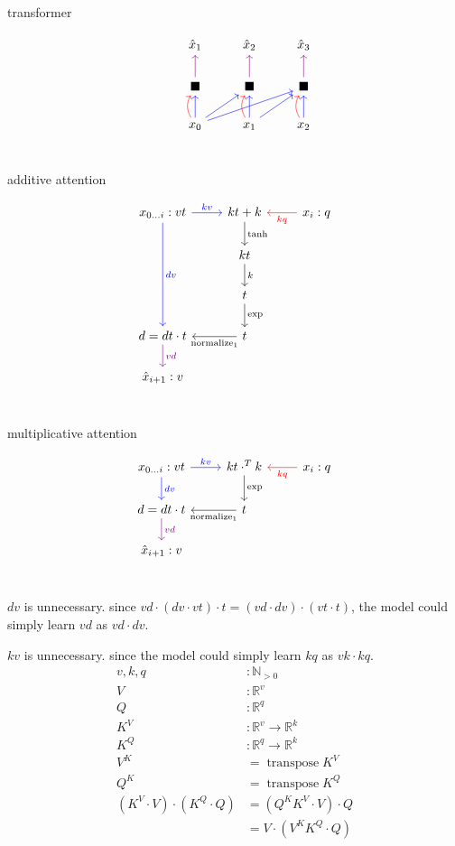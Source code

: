 \documentclass{article}
\begin{document}
transformer

\[\begin{tikzcd}
    &\hat{x}_{1} &\hat{x}_{2} &\hat{x}_{3}\\
    &\blacksquare \ar[violet]{u} &\blacksquare \ar[violet]{u} &\blacksquare \ar[violet]{u}\\
    &x_{0} \ar[red, bend left]{u} \ar[blue]{u} \ar[blue]{ur} \ar[blue]{urr} &x_{1} \ar[red, bend left]{u} \ar[blue]{u} \ar[blue]{ur} &x_{2} \ar[red, bend left]{u} \ar[blue]{u}\\
  \end{tikzcd}\]

additive attention

\[\begin{tikzcd}
    x_{0 \ldots i} : vt \ar[blue]{ddd}{dv} \ar[blue]{r}{kv} &kt + k \ar{d}{\tanh} &x_{i} : q \ar[red]{l}{kq}\\
    &kt \ar{d}{k} &\\
    &t \ar{d}{\exp} &\\
    d = dt \cdot t \ar[violet]{d}{vd} &t \ar{l}{\operatorname{normalize}_{1}} &\\
    \hat{x}_{i+1} : v &&\\
  \end{tikzcd}\]

multiplicative attention

\[\begin{tikzcd}
    x_{0 \ldots i} : vt \ar[blue]{d}{dv} \ar[blue]{r}{kv} &kt \cdot^{T} k \ar{d}{\exp} &x_{i} : q \ar[red]{l}{kq}\\
    d = dt \cdot t \ar[violet]{d}{vd} &t \ar{l}{\operatorname{normalize}_{1}} &\\
    \hat{x}_{i+1} : v &&\\
  \end{tikzcd}\]

\(dv\) is unnecessary.
since \(vd \cdot (dv \cdot vt) \cdot t = (vd \cdot dv) \cdot (vt \cdot t)\),
the model could simply learn \(vd\) as \(vd \cdot dv\).

\(kv\) is unnecessary.
since the model could simply learn \(kq\) as \(vk \cdot kq\).
\begin{align*}
  v, k, q &: \mathbb{N}_{>0}\\
  V &: \mathbb{R}^{v}\\
  Q &: \mathbb{R}^{q}\\
  K^{V} &: \mathbb{R}^{v} \to \mathbb{R}^{k}\\
  K^{Q} &: \mathbb{R}^{q} \to \mathbb{R}^{k}\\
  V^{K} &= \operatorname{transpose} K^{V}\\
  Q^{K} &= \operatorname{transpose} K^{Q}\\
  (K^{V} \cdot V) \cdot (K^{Q} \cdot Q) &= (Q^{K}K^{V} \cdot V) \cdot Q\\
          &= V \cdot (V^{K}K^{Q} \cdot Q)\\
\end{align*}
\end{document}
